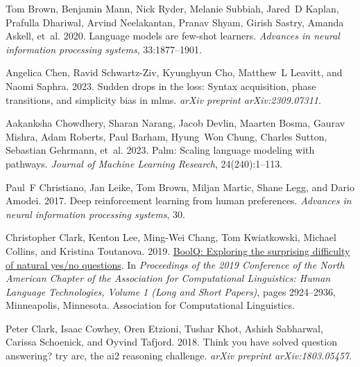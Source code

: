 \documentclass[11pt]{article}
\begin{document}
\begin{thebibliography}{88}
    Tom Brown, Benjamin Mann, Nick Ryder, Melanie Subbiah, Jared~D Kaplan, Prafulla Dhariwal, Arvind Neelakantan, Pranav Shyam, Girish Sastry, Amanda Askell, et~al. 2020.
    \newblock Language models are few-shot learners.
    \newblock \emph{Advances in neural information processing systems}, 33:1877--1901.
    
    Angelica Chen, Ravid Schwartz-Ziv, Kyunghyun Cho, Matthew~L Leavitt, and Naomi Saphra. 2023.
    \newblock Sudden drops in the loss: Syntax acquisition, phase transitions, and simplicity bias in mlms.
    \newblock \emph{arXiv preprint arXiv:2309.07311}.
    
    Aakanksha Chowdhery, Sharan Narang, Jacob Devlin, Maarten Bosma, Gaurav Mishra, Adam Roberts, Paul Barham, Hyung~Won Chung, Charles Sutton, Sebastian Gehrmann, et~al. 2023.
    \newblock Palm: Scaling language modeling with pathways.
    \newblock \emph{Journal of Machine Learning Research}, 24(240):1--113.
    
    Paul~F Christiano, Jan Leike, Tom Brown, Miljan Martic, Shane Legg, and Dario Amodei. 2017.
    \newblock Deep reinforcement learning from human preferences.
    \newblock \emph{Advances in neural information processing systems}, 30.
    
    Christopher Clark, Kenton Lee, Ming-Wei Chang, Tom Kwiatkowski, Michael Collins, and Kristina Toutanova. 2019.
    \newblock \href {https://doi.org/10.18653/v1/N19-1300} {{B}ool{Q}: Exploring the surprising difficulty of natural yes/no questions}.
    \newblock In \emph{Proceedings of the 2019 Conference of the North {A}merican Chapter of the Association for Computational Linguistics: Human Language Technologies, Volume 1 (Long and Short Papers)}, pages 2924--2936, Minneapolis, Minnesota. Association for Computational Linguistics.
    
    Peter Clark, Isaac Cowhey, Oren Etzioni, Tushar Khot, Ashish Sabharwal, Carissa Schoenick, and Oyvind Tafjord. 2018.
    \newblock Think you have solved question answering? try arc, the ai2 reasoning challenge.
    \newblock \emph{arXiv preprint arXiv:1803.05457}.
    

\end{thebibliography}
\end{document}
